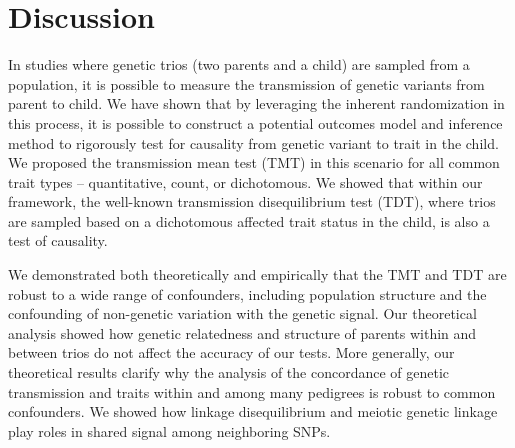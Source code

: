 \documentclass[12pt]{extarticle}
\newcommand{\nind}{J}
\newcommand{\nsnp}{I}
\begin{document}
{%


\section{Discussion}\label{sec:discussion_mendel}


In studies where genetic trios (two parents and a child) are sampled from a population, it is possible to measure the transmission of genetic variants from parent to child. We have shown that by leveraging the inherent randomization in this process, it is possible to construct a potential outcomes model and inference method to rigorously test for causality from genetic variant to trait in the child. We proposed the transmission mean test (TMT) in this scenario for all common trait types -- quantitative, count, or dichotomous. We showed that within our framework, the well-known transmission disequilibrium test (TDT), where trios are sampled based on a dichotomous affected trait status in the child, is also a test of causality.

We demonstrated both theoretically and empirically that the TMT and TDT are robust to a wide range of confounders, including population structure and the confounding of non-genetic variation with the genetic signal. Our theoretical analysis showed how genetic relatedness and structure of parents within and between trios do not affect the accuracy of our tests. More generally, our theoretical results clarify why the analysis of the concordance of genetic transmission and traits within and among many pedigrees is robust to common confounders. We showed how linkage disequilibrium and meiotic genetic linkage play roles in shared signal among neighboring SNPs. 

}
\end{document}
